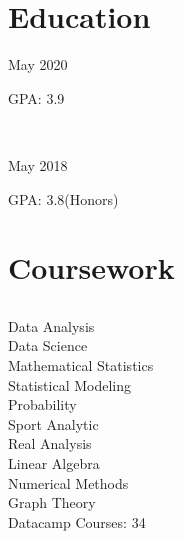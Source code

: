

\begin{minipage}[t]{0.33\textwidth} %


\section{Education} 
\vspace{\topsep} %
\vspace{1pt}

\begin{tightitemize}
\item May 2020
\item GPA: 3.9
\end{tightitemize}

 \\
\begin{tightitemize}
\item May 2018
\item GPA: 3.8(Honors)
\end{tightitemize}




\section{Coursework}

\subsection{}
Data Analysis \\
Data Science \\
Mathematical Statistics \\
Statistical Modeling \\
Probability \\
Sport Analytic \\
Real Analysis \\
Linear Algebra \\
Numerical Methods \\
Graph Theory \\
Datacamp Courses: 34



\end{minipage}
